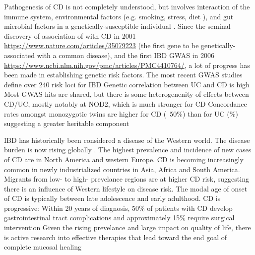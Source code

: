 \begin{outline}
\1 Pathogenesis of CD is not completely understood, but involves interaction of the immune system, environmental factors (e.g. smoking, stress, diet \autocite{ananthakrishnan2015EpidemiologyRiskFactors,roda2020CrohnDisease}), and gut microbial factors in a genetically-susceptible individual \autocite{desouza2016ImmunopathogenesisIBDCurrent}.
    \2 Since the seminal discovery of association of  with CD in 2001 \url{https://www.nature.com/articles/35079223} (the first gene to be genetically-associated with a common disease), and the first IBD GWAS in 2006 \url{https://www.ncbi.nlm.nih.gov/pmc/articles/PMC4410764/}, a lot of progress has been made in establishing genetic risk factors.
    \2 The most recent GWAS studies define over 240 risk loci for IBD \autocite{delange2017GenomewideAssociationStudy}
    \2 Genetic correlation between UC and CD is high \autocite{cotsapas2013ImmunemediatedDiseaseGenetics,david2018GeneticsImmunemediatedInflammatory}
    \2 Most GWAS hits are shared, but there is some heterogenenity of effects between CD/UC, mostly notably at NOD2, which is much stronger for CD \autocite{jostins2012HostMicrobeInteractions,liu2015AssociationAnalysesIdentify}
    \2 Concordance rates amongst monozygotic twins are higher for CD (~50\%) than for UC (\%) suggesting a greater heritable component \autocite{roda2020CrohnDisease}

\1 IBD has historically been considered a disease of the Western world.
    \2 The disease burden is now rising globally \autocite{kaplan2015GlobalBurdenIBD,alatab2020GlobalRegionalNational}.
    \2 The highest prevalence and incidence of new cases of CD are in North America and western Europe. \autocite{roda2020CrohnDisease}
    \2 CD is becoming increasingly common in newly industrialized countries in Asia, Africa and South America.
        \3 Migrants from low- to high- prevelance regions are at higher CD risk, suggesting there is an influence of Western lifestyle on disease risk. \autocite{roda2020CrohnDisease}
    \2 The modal age of onset of CD is typically between late adolescence and early adulthood.
    \2 CD is progressive: Within 20 years of diagnosis, 50\% of patients with CD develop gastrointestinal tract complications and approximately 15\% require surgical intervention \autocite{roda2020CrohnDisease}
    \2 Given the rising prevelance and large impact on quality of life, there is active research into effective therapies that lead toward the end goal of complete mucosal healing \autocite{levin2016MechanismActionAntiTNF,roda2020CrohnDisease} 


\end{outline}

